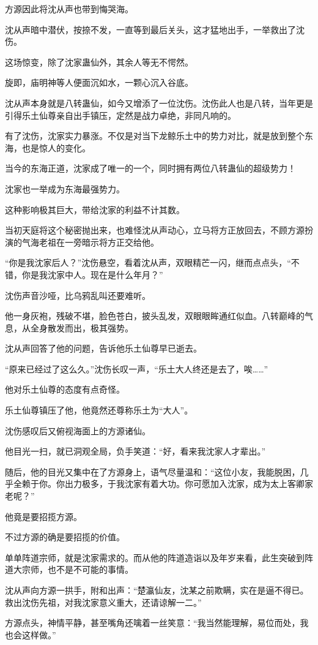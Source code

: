 \begin{this_body}
方源因此将沈从声也带到悔哭海。

沈从声暗中潜伏，按捺不发，一直等到最后关头，这才猛地出手，一举救出了沈伤。

这场惊变，除了沈家蛊仙外，其余人等无不愕然。

旋即，庙明神等人便面沉如水，一颗心沉入谷底。

沈从声本身就是八转蛊仙，如今又增添了一位沈伤。沈伤此人也是八转，当年更是引得乐土仙尊亲自出手镇压，定然是战力卓绝，非同凡响的。

有了沈伤，沈家实力暴涨。不仅是对当下龙鲸乐土中的势力对比，就是放到整个东海，也是惊人的变化。

当今的东海正道，沈家成了唯一的一个，同时拥有两位八转蛊仙的超级势力！

沈家也一举成为东海最强势力。

这种影响极其巨大，带给沈家的利益不计其数。

当初天庭将这个秘密抛出来，也难怪沈从声动心，立马将方正放回去，不顾方源扮演的气海老祖在一旁暗示将方正交给他。

“你是我沈家后人？”沈伤悬空，看着沈从声，双眼精芒一闪，继而点点头，“不错，你是我沈家中人。现在是什么年月？”

沈伤声音沙哑，比乌鸦乱叫还要难听。

他一身灰袍，残破不堪，脸色苍白，披头乱发，双眼眼眸通红似血。八转巅峰的气息，从全身散发而出，极其强势。

沈从声回答了他的问题，告诉他乐土仙尊早已逝去。

“原来已经过了这么久。”沈伤长叹一声，“乐土大人终还是去了，唉……”

他对乐土仙尊的态度有点奇怪。

乐土仙尊镇压了他，他竟然还尊称乐土为“大人”。

沈伤感叹后又俯视海面上的方源诸仙。

他目光一扫，就已洞观全局，负手笑道：“好，看来我沈家人才辈出。”

随后，他的目光又集中在了方源身上，语气尽量温和：“这位小友，我能脱困，几乎全赖于你。你出力极多，于我沈家有着大功。你可愿加入沈家，成为太上客卿家老呢？”

他竟是要招揽方源。

不过方源的确是要招揽的价值。

单单阵道宗师，就是沈家需求的。而从他的阵道造诣以及年岁来看，此生突破到阵道大宗师，也不是不可能的事情。

沈从声向方源一拱手，附和出声：“楚瀛仙友，沈某之前欺瞒，实在是逼不得已。救出沈伤先祖，对我沈家意义重大，还请谅解一二。”

方源点头，神情平静，甚至嘴角还噙着一丝笑意：“我当然能理解，易位而处，我也会这样做。”


\end{this_body}
